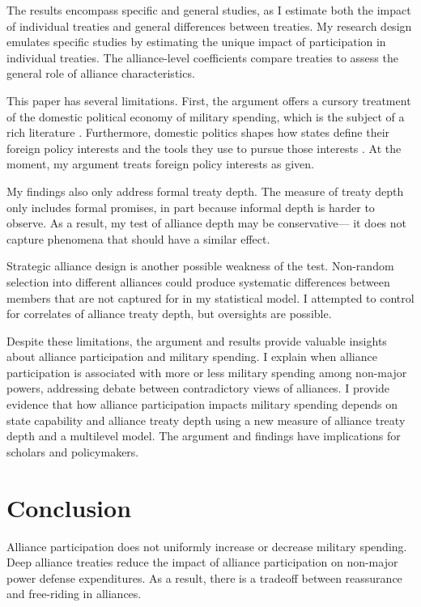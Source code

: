 \documentclass[12pt]{article}
\begin{document}
The results encompass specific and general studies, as I estimate both the impact of individual treaties and general differences between treaties. 
My research design emulates specific studies by estimating the unique impact of participation in individual treaties. 
The alliance-level coefficients compare treaties to assess the general role of alliance characteristics. 


This paper has several limitations.
First, the argument offers a cursory treatment of the domestic political economy of military spending, which is the subject of a rich literature \citep{WhittenWilliams2011, AlptekinLevine2012}.  
Furthermore, domestic politics shapes how states define their foreign policy interests and the tools they use to pursue those interests \citep{Fordham1998, Fordham2011, Narizny2007}. 
At the moment, my argument treats foreign policy interests as given.  


My findings also only address formal treaty depth. 
The measure of treaty depth only includes formal promises, in part because informal depth is harder to observe. 
As a result, my test of alliance depth may be conservative--- it does not capture phenomena that should have a similar effect. 


Strategic alliance design is another possible weakness of the test. 
Non-random selection into different alliances could produce systematic differences between members that are not captured for in my statistical model. 
I attempted to control for correlates of alliance treaty depth, but oversights are possible.


Despite these limitations, the argument and results provide valuable insights about alliance participation and military spending. 
I explain when alliance participation is associated with more or less military spending among non-major powers, addressing debate between contradictory views of alliances.  
I provide evidence that how alliance participation impacts military spending depends on state capability and alliance treaty depth using a new measure of alliance treaty depth and a multilevel model. 
The argument and findings have implications for scholars and policymakers. 


\section{Conclusion}

Alliance participation does not uniformly increase or decrease military spending. 
Deep alliance treaties reduce the impact of alliance participation on non-major power defense expenditures. 
As a result, there is a tradeoff between reassurance and free-riding in alliances. 
\end{document}
